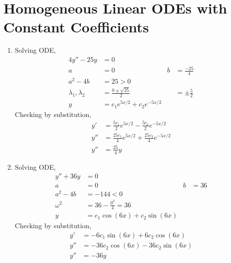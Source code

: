 \section{Homogeneous Linear ODEs with Constant Coefficients}

\begin{enumerate}
    \item Solving ODE,
          \begin{align}
              4y'' - 25y               & = 0                                                      \\
              a                        & = 0                              & b & = \frac{-25}{4}   \\
              a^{2} - 4b               & = 25 > 0                                                 \\
              \lambda_{1}, \lambda_{2} & = \frac{0 \pm \sqrt{25}}{2}      &   & = \pm \frac{5}{2} \\
              y                        & = c_{1}e^{5x/2} + c_{2}e^{-5x/2}
          \end{align}
          Checking by substitution,
          \begin{align}
              y'  & = \frac{5c_{1}}{2}e^{5x/2} - \frac{5c_{2}}{2}e^{-5x/2}   \\
              y'' & = \frac{25c_{1}}{4}e^{5x/2} + \frac{25c_{2}}{4}e^{-5x/2} \\
              y'' & = \frac{25}{4}y
          \end{align}

    \item Solving ODE,
          \begin{align}
              y'' + 36y  & = 0                                        \\
              a          & = 0                             & b & = 36 \\
              a^{2} - 4b & = -144 < 0                                 \\
              \omega^{2} & = 36 - \frac{0^{2}}{4} = 36                \\
              y          & = c_{1}\cos(6x) + c_{2}\sin(6x)
          \end{align}
          Checking by substitution,
          \begin{align}
              y'  & = -6c_{1}\sin(6x) + 6c_{2}\cos(6x)   \\
              y'' & = -36c_{2}\cos(6x) - 36c_{2}\sin(6x) \\
              y'' & = -36y
          \end{align}


\end{enumerate}
